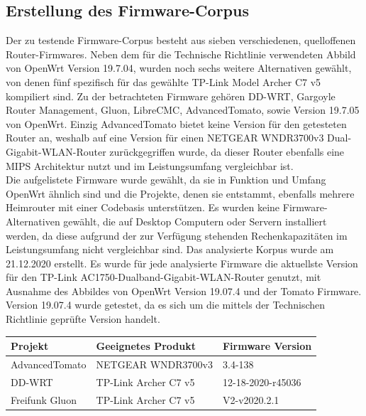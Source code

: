 \documentclass[a4paper]{book}
\begin{document}
\begin{large}
\subsection{Erstellung des Firmware-Corpus}
\begin{onehalfspace}
Der zu testende Firmware-Corpus besteht aus sieben verschiedenen, quelloffenen Router-Firmwares. Neben dem für die Technische Richtlinie verwendeten Abbild von OpenWrt Version 19.7.04, wurden noch sechs weitere Alternativen gewählt, von denen fünf spezifisch für das gewählte TP-Link Model Archer C7 v5 kompiliert sind. Zu der betrachteten \mbox Firmware gehören DD-WRT, Gargoyle Router Management, Gluon, LibreCMC, AdvancedTomato, sowie Version 19.7.05 von OpenWrt. Einzig AdvancedTomato bietet keine Version für den getesteten Router an, weshalb auf eine Version für einen NETGEAR WNDR3700v3 Dual-Gigabit-WLAN-Router zurückgegriffen wurde, da dieser Router ebenfalls eine MIPS Architektur nutzt und im Leistungsumfang vergleichbar ist. 	\\ 
\indent Die aufgelistete Firmware wurde gewählt, da sie in Funktion und Umfang OpenWrt ähnlich sind und die Projekte, denen sie entstammt, ebenfalls mehrere Heimrouter mit einer Codebasis unterstützen. Es wurden keine Firmware-Alternativen gewählt, die auf Desktop Computern oder Servern installiert werden, da diese aufgrund der zur Verfügung stehenden Rechenkapazitäten im Leistungsumfang nicht vergleichbar sind. Das analysierte Korpus wurde am 21.12.2020 erstellt. Es wurde für jede analysierte Firmware die aktuellste Version für den TP-Link AC1750-Dualband-Gigabit-WLAN-Router genutzt, mit Ausnahme des Abbildes von OpenWrt Version 19.07.4 und der Tomato Firmware. Version 19.07.4 wurde getestet, da es sich um die mittels der Technischen Richtlinie geprüfte Version handelt. \\ 

\begin{table}[ht]
\begin{center}
\def\arraystretch{1.4}
\begin{tabular}{lll}

\textbf{Projekt} & \textbf{Geeignetes Produkt} & \textbf{Firmware Version} \\ 
\hline 
AdvancedTomato & NETGEAR WNDR3700v3 & 3.4-138 \\ 

DD-WRT & TP-Link Archer C7 v5 & 12-18-2020-r45036 \\ 

Freifunk Gluon & TP-Link Archer C7 v5 & V2-v2020.2.1 \\ 


\end{tabular}
\end{center}
\end{table}
\end{onehalfspace}
\end{large}
\end{document}
